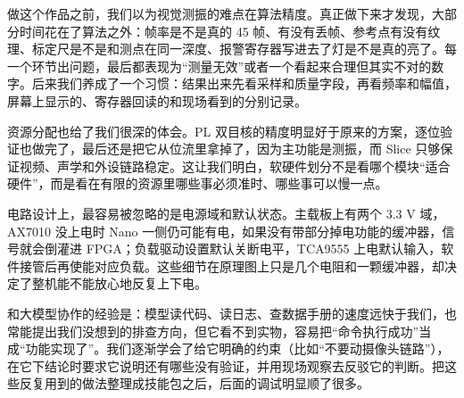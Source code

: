 做这个作品之前，我们以为视觉测振的难点在算法精度。真正做下来才发现，大部分时间花在了算法之外：帧率是不是真的 45 帧、有没有丢帧、参考点有没有纹理、标定尺是不是和测点在同一深度、报警寄存器写进去了灯是不是真的亮了。每一个环节出问题，最后都表现为“测量无效”或者一个看起来合理但其实不对的数字。后来我们养成了一个习惯：结果出来先看采样和质量字段，再看频率和幅值，屏幕上显示的、寄存器回读的和现场看到的分别记录。

资源分配也给了我们很深的体会。PL 双目核的精度明显好于原来的方案，逐位验证也做完了，最后还是把它从位流里拿掉了，因为主功能是测振，而 Slice 只够保证视频、声学和外设链路稳定。这让我们明白，软硬件划分不是看哪个模块“适合硬件”，而是看在有限的资源里哪些事必须准时、哪些事可以慢一点。

电路设计上，最容易被忽略的是电源域和默认状态。主载板上有两个 3.3 V 域，AX7010 没上电时 Nano 一侧仍可能有电，如果没有带部分掉电功能的缓冲器，信号就会倒灌进 FPGA；负载驱动设置默认关断电平，TCA9555 上电默认输入，软件接管后再使能对应负载。这些细节在原理图上只是几个电阻和一颗缓冲器，却决定了整机能不能放心地反复上下电。

和大模型协作的经验是：模型读代码、读日志、查数据手册的速度远快于我们，也常能提出我们没想到的排查方向，但它看不到实物，容易把“命令执行成功”当成“功能实现了”。我们逐渐学会了给它明确的约束（比如“不要动摄像头链路”），在它下结论时要求它说明还有哪些没有验证，并用现场观察去反驳它的判断。把这些反复用到的做法整理成技能包之后，后面的调试明显顺了很多。

\clearpage
